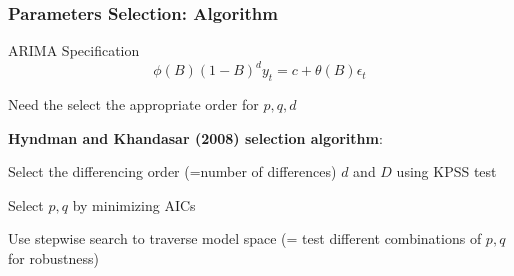 \documentclass{beamer}
\newenvironment{wideitemize}{\itemize\addtolength{\itemsep}{10pt}}{\enditemize}
\begin{document}
\begin{frame}
  \frametitle{Parameters Selection: Algorithm}
  \begin{block}{ARIMA Specification}
    \begin{equation*}
    \phi(B) (1-B)^d y_t = c + \theta(B) \epsilon_t      
    \end{equation*}

    \begin{wideitemize}
      \item Need the select the appropriate order for $p, q, d$
    \end{wideitemize}
    
  \end{block}

\medskip
  
\textbf{Hyndman and Khandasar (2008) selection algorithm}:\\

\begin{wideitemize}
  \item Select the differencing order (=number of differences) \textbf{$d$} and \textbf{$D$} using KPSS test
  \item Select $p, q$ by minimizing AICs
  \item Use stepwise search to traverse model space (= test different combinations of $p, q$ for robustness)
\end{wideitemize}

\end{frame}
\end{document}
